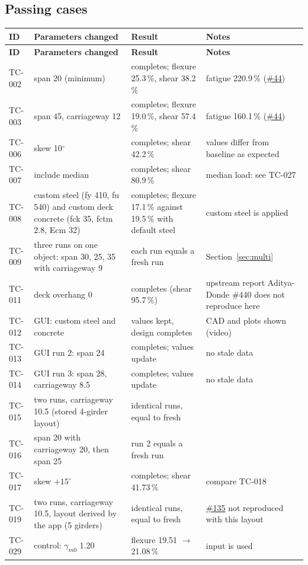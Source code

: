 \documentclass[10pt,a4paper]{article}
\newcommand{\gh}[1]{\href{https://github.com/Nidhikhare12/OsdagBridge/issues/#1}{\##1}}
\begin{document}
\subsection{Passing cases}
\begin{longtable}{@{}L{1.25cm}L{4.6cm}L{5.2cm}L{5.4cm}@{}}
\toprule
\textbf{ID} & \textbf{Parameters changed} & \textbf{Result} & \textbf{Notes}\\
\midrule\endfirsthead
\toprule \textbf{ID} & \textbf{Parameters changed} & \textbf{Result} & \textbf{Notes}\\ \midrule\endhead
TC-002 & span 20 (minimum) & completes; flexure 25.3\,\%, shear 38.2\,\% & fatigue 220.9\,\% (\gh{44})\\
TC-003 & span 45, carriageway 12 & completes; flexure 19.0\,\%, shear 57.4\,\% & fatigue 160.1\,\% (\gh{44})\\
TC-006 & skew 10$^{\circ}$ & completes; shear 42.2\,\% & values differ from baseline as expected\\
TC-007 & include median & completes; shear 80.9\,\% & median load: see TC-027\\
TC-008 & custom steel (fy 410, fu 540) and custom deck concrete (fck 35, fctm 2.8, Ecm 32) & completes; flexure 17.1\,\% against 19.5\,\% with default steel & custom steel is applied\\
TC-009 & three runs on one object: span 30, 25, 35 with carriageway 9 & each run equals a fresh run & Section~\ref{sec:multi}\\
TC-011 & deck overhang 0 & completes (shear 95.7\,\%) & upstream report Aditya-Donde \#440 does not reproduce here\\
TC-012 & GUI: custom steel and concrete & values kept, design completes & CAD and plots shown (video)\\
TC-013 & GUI run 2: span 24 & completes; values update & no stale data\\
TC-014 & GUI run 3: span 28, carriageway 8.5 & completes; values update & no stale data\\
TC-015 & two runs, carriageway 10.5 (stored 4-girder layout) & identical runs, equal to fresh & \\
TC-016 & span 20 with carriageway 20, then span 25 & run 2 equals a fresh run & \\
TC-017 & skew $+15^{\circ}$ & completes; shear 41.73\,\% & compare TC-018\\
TC-019 & two runs, carriageway 10.5, layout derived by the app (5 girders) & identical runs, equal to fresh & \gh{135} not reproduced with this layout\\
TC-029 & control: $\gamma_{m0}$ 1.20 & flexure 19.51 $\rightarrow$ 21.08\,\% & input is used\\
\bottomrule
\end{longtable}
\end{document}
